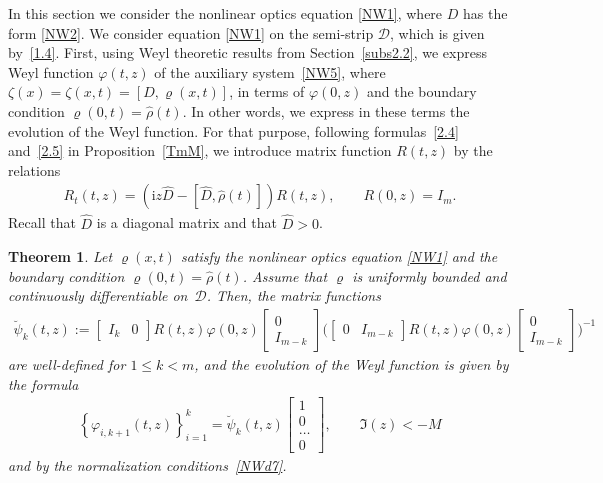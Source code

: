 \documentclass[11pt]{article}
\newtheorem{Theorem}{Theorem}[section]
\def\vr{\varrho}
\def\vp{\varphi}
\def\wh{\widehat}
\newcommand{\I}{\mathrm{i}}
\newcommand{\cD}{{\mathcal D}}
\numberwithin{equation}{section}
\begin{document}
In this section we consider the nonlinear optics equation \eqref{NW1}, where $D$ has the form \eqref{NW2}.
We consider equation \eqref{NW1} on the semi-strip $\cD$, which is given by~\eqref{1.4}. First, using Weyl theoretic
results from Section~\ref{subs2.2}, we express Weyl function $\vp(t,z)$ of the auxiliary system~\eqref{NW5},
where $\zeta(x)=\zeta(x,t)=[D,\vr(x,t)]$, in terms of $\vp(0,z)$ and
the boundary condition $\vr(0,t)=\wh \rho(t)$. In other words, we express in these terms the evolution of the Weyl function.
For that purpose, following formulas~\eqref{2.4} and~\eqref{2.5} in Proposition~\ref{TmM},
we introduce matrix function $R(t,z)$ by the relations
\begin{gather} \label{NW20}
R_t(t,z)=(\I z \wh D-[\wh D,\wh \rho(t)])R(t,z), \qquad R(0,z)=I_m.
\end{gather}
Recall that $\wh D$ is a diagonal matrix and that $\wh D>0$.
\begin{Theorem}
\label{TmNWevol}
Let $\vr(x,t)$ satisfy the nonlinear optics equation \eqref{NW1} and the boundary condition $\vr(0,t)=\wh \rho(t)$.
Assume that $\vr$ is uniformly bounded and continuously differentiable on~$\cD$.
Then, the matrix functions
\begin{gather} \label{NW21}
\breve \psi_k(t,z):=
 \begin{bmatrix} I_k & 0\end{bmatrix}
R(t,z) \varphi (0,z)
 \left[
  \begin{matrix}
    0  \\
    I_{m-k}
  \end{matrix}
 \right]
 \biggl(
 \begin{bmatrix} 0 & I_{m-k}\end{bmatrix}
  R(t,z) \varphi (0,z)
  \left[
  \begin{matrix}
    0  \\
    I_{m-k}
  \end{matrix}
  \right]
 \biggr)^{-1}
\end{gather}
are well-defined for $1\leq k <m$, and the evolution of the Weyl function is given by the formula
\begin{gather} \label{NW22}
  \left\{
   \varphi_{i, k+1}(t,z)
  \right\}_{i=1}^k
 = \breve \psi_k (t,z)\begin{bmatrix} 1\\ 0 \\ \ldots \\0
 \end{bmatrix}, \qquad \Im(z)<-M
\end{gather}
and by the normalization conditions~\eqref{NWd7}.
\end{Theorem}
\end{document}
